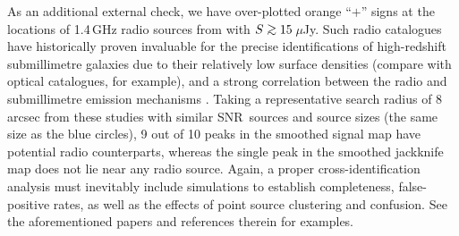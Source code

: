 \documentclass[useAMS,usenatbib,nofootinbib]{mn2e}
\newcommand{\snr}{SNR}
\def\gsim{\mathrel{\lower2.5pt\vbox{\lineskip=0pt\baselineskip=0pt
          \hbox{$>$}\hbox{$\sim$}}}}
\begin{document}
As an additional external check, we have over-plotted orange ``$+$''
signs at the locations of 1.4\,GHz radio sources from \citet{owen2008}
with $S\gsim15$\,$\mu$Jy. Such radio catalogues have historically
proven invaluable for the precise identifications of high-redshift
submillimetre galaxies due to their relatively low surface densities
(compare with optical catalogues, for example), and a strong
correlation between the radio and submillimetre emission mechanisms
\citep[e.g.][]{smail2000,pope2006,ivison2007,chapin2009b}. Taking a
representative search radius of 8\,arcsec from these studies with
similar \snr\ sources and source sizes (the same size as the blue
circles), 9 out of 10 peaks in the smoothed signal map have potential
radio counterparts, whereas the single peak in the smoothed jackknife
map does not lie near any radio source. Again, a proper
cross-identification analysis must inevitably include simulations to
establish completeness, false-positive rates, as well as the effects
of point source clustering and confusion. See the aforementioned
papers and references therein for examples.
\end{document}
